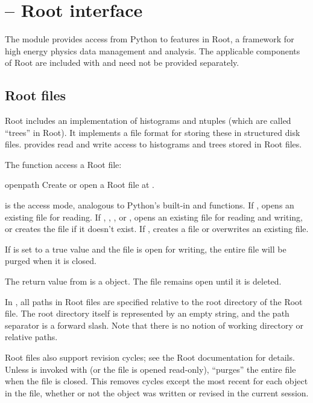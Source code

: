 \section{ -- Root interface}


The  module provides access from Python to features in
Root, a framework for high energy physics data management and analysis.
The applicable components of Root are included with \pyhep and need not
be provided separately.

\subsection{Root files}

Root includes an implementation of histograms and ntuples (which are
called ``trees'' in Root).  It implements a file format for storing
these in structured disk files.  \pyhep provides read and write access
to histograms and trees stored in Root files.

The  function access a Root file:

\begin{funcdesc}{open}{path}
 Create or open a Root file at .  

  is the access mode, analogous to Python's built-in
  and  functions.  If , opens an
 existing file for reading.  If , , , or
 , opens an existing file for reading and writing, or creates
 the file if it doesn't exist.  If , creates a file or
 overwrites an existing file.

 If  is set to a true value and the file is open for
 writing, the entire file will be purged when it is closed.  
\end{funcdesc}

The return value from  is a  object.  The
file remains open until it is deleted.  

In \pyhep, all paths in Root files are specified relative to the root
directory of the Root file.  The root directory itself is represented by
an empty string, and the path separator is a forward slash.  Note that
there is no notion of working directory or relative paths.

Root files also support revision cycles; see the Root documentation for
details.  Unless  is invoked with
 (or the file is opened read-only), \pyhep
``purges'' the entire file when the file is closed.  This removes cycles
except the most recent for each object in the file, whether or not the
object was written or revised in the current session.

